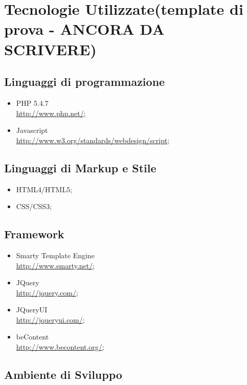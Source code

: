 \chapter{Tecnologie Utilizzate(template di prova - ANCORA DA SCRIVERE)}
  \section{Linguaggi di programmazione}
    \begin{itemize}
     \item PHP 5.4.7 \\
     \href{http://www.php.net/}{http://www.php.net/};
     \item Javascript \\
     \href{http://www.w3.org/standards/webdesign/script}{http://www.w3.org/standards/webdesign/script};
    \end{itemize}
   \section{Linguaggi di Markup e Stile}
    \begin{itemize}
     \item HTML4/HTML5;
     \item CSS/CSS3;
    \end{itemize}
   \section{Framework}
    \begin{itemize}
     \item Smarty Template Engine \\
	\href{http://www.smarty.net/}{http://www.smarty.net/};
     \item JQuery\\
	\href{http://jquery.com/}{http://jquery.com/};
     \item JQueryUI\\
	\href{http://jqueryui.com/}{http://jqueryui.com/};
     \item beContent\\
	\href{http://www.becontent.org/}{http://www.becontent.org/};
    \end{itemize}
   \section{Ambiente di Sviluppo}
